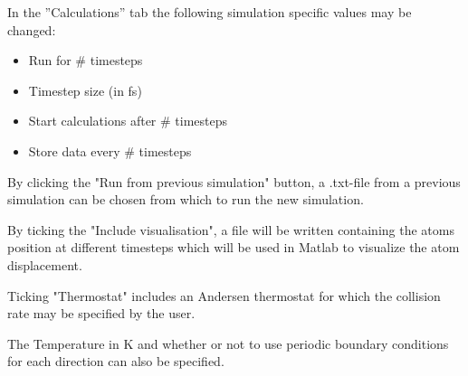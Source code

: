 In the ''Calculations'' tab the following simulation specific values may be changed:
\begin{itemize}
\item Run for \# timesteps 
\item Timestep size (in fs)
\item Start calculations after \# timesteps
\item Store data every \# timesteps
\end{itemize}

By clicking the "Run from previous simulation" button, a .txt-file from a previous simulation can be chosen from which to run the new simulation.

By ticking the "Include visualisation", a file will be written containing the atoms position at different timesteps which will be used in Matlab to visualize the atom displacement.

Ticking "Thermostat" includes an Andersen thermostat for which the collision rate may be specified by the user.

The Temperature in K and whether or not to use periodic boundary conditions for each direction can also be specified.

